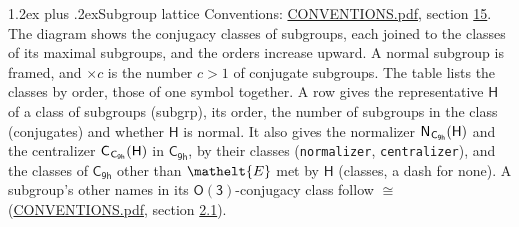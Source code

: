 \documentclass[10pt,a4paper]{article}
\makeatletter
\renewcommand\section{\@startsection{section}{1}{\z@}{-3ex plus -1ex minus -.2ex}%
  {1.2ex plus .2ex}{\normalfont\large\sffamily\bfseries\color{parttitle}}}
\numberwithin{equation}{section}
\newcommand{\eltfont}[1]{{\let\sigma\eltsigma\mathelt{#1}}}
\newcommand{\grp}[1]{\mathsf{#1}}
\newcommand{\cls}[1]{\eltfont{#1}}
\newcommand{\samecls}{\cong}
\newcommand{\hairsp}{\mkern1mu}
\makeatother
\begin{document}
\section{Subgroup lattice}\label{s:subgroups}
Conventions: \href{../../CONVENTIONS.pdf}{CONVENTIONS.pdf}, section \href{../../CONVENTIONS.pdf\#conv.15}{15}.
The diagram shows the conjugacy classes of subgroups, each joined to the classes of its maximal subgroups, and the orders increase upward. \label{n:index.conjugates.c}A normal subgroup is framed, and ${\times}c$ is the number $c > 1$ of conjugate subgroups. The table lists the classes by order, those of one symbol together. \label{n:group.H}\label{n:head.subgroup}\label{n:head.order}\label{n:head.conjugates}\label{n:head.normal}A row gives the representative $\grp{H}$ of a class of subgroups (subgrp), its order, the number of subgroups in the class (conjugates) and whether $\grp{H}$ is normal. \label{n:group.normalizer}\label{n:group.centralizer}\label{n:head.classes}It also gives the normalizer $\grp{N}_{\hairsp \grp{C_{9h}}}(\grp{H})$ and the centralizer $\grp{C}_{\hairsp \grp{C_{9h}}}(\grp{H})$ in $\grp{C_{9h}}$, by their classes (\texttt{normalizer}, \texttt{centralizer}), and the classes of $\grp{C_{9h}}$ other than $\cls{E}$ met by $\grp{H}$ (classes, a dash for none). A subgroup's other names in its \href{O3.pdf}{$\grp{O(3)}$}-conjugacy class follow $\samecls$ (\href{../../CONVENTIONS.pdf}{CONVENTIONS.pdf}, section \href{../../CONVENTIONS.pdf\#conv.2.1}{2.1}).
\begin{center}
\end{center}
\end{document}
